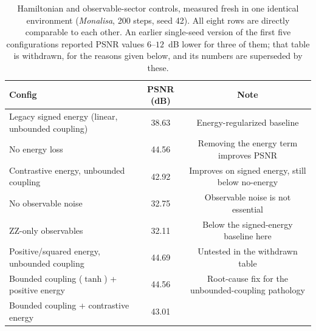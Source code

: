 \documentclass[11pt]{article}
\begin{document}
\begin{table}[H]
\centering
\caption{Hamiltonian and observable-sector controls, measured fresh in one identical environment (\textit{Monalisa}, 200 steps, seed 42). All eight rows are directly comparable to each other. An earlier single-seed version of the first five configurations reported PSNR values $6$--$12$~dB lower for three of them; that table is withdrawn, for the reasons given below, and its numbers are superseded by these.}
\label{tab:hamiltonian_reproducibility}
\scriptsize
\begin{tabular}{lcc}
\toprule
Config & PSNR (dB) & Note \\
\midrule
Legacy signed energy (linear, unbounded coupling) & 38.63 & Energy-regularized baseline \\
No energy loss & 44.56 & Removing the energy term improves PSNR \\
Contrastive energy, unbounded coupling & 42.92 & Improves on signed energy, still below no-energy \\
No observable noise & 32.75 & Observable noise is not essential \\
ZZ-only observables & 32.11 & Below the signed-energy baseline here \\
Positive/squared energy, unbounded coupling & 44.69 & Untested in the withdrawn table \\
Bounded coupling ($\tanh$) + positive energy & 44.56 & Root-cause fix for the unbounded-coupling pathology \\
Bounded coupling + contrastive energy & 43.01 & \\
\bottomrule
\end{tabular}
\end{table}
\end{document}
